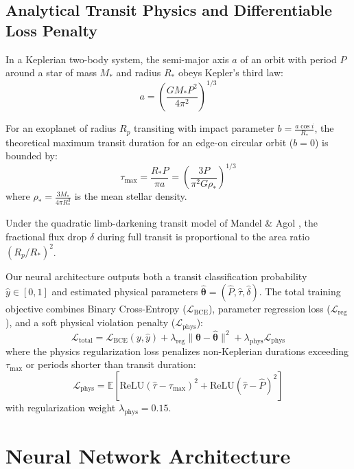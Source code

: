 \documentclass[11pt,a4paper]{article}
\begin{document}
\subsection{Analytical Transit Physics and Differentiable Loss Penalty}

In a Keplerian two-body system, the semi-major axis $a$ of an orbit with period $P$ around a star of mass $M_*$ and radius $R_*$ obeys Kepler's third law:
\begin{equation}
    a = \left( \frac{G M_* P^2}{4\pi^2} \right)^{1/3}
\end{equation}

For an exoplanet of radius $R_p$ transiting with impact parameter $b = \frac{a \cos i}{R_*}$, the theoretical maximum transit duration for an edge-on circular orbit ($b=0$) is bounded by:
\begin{equation}
    \tau_{\text{max}} = \frac{R_* P}{\pi a} = \left( \frac{3 P}{\pi^2 G \rho_*} \right)^{1/3}
\end{equation}
where $\rho_* = \frac{3 M_*}{4 \pi R_*^3}$ is the mean stellar density.

Under the quadratic limb-darkening transit model of Mandel \& Agol \citep{mandel2002analytic}, the fractional flux drop $\delta$ during full transit is proportional to the area ratio $(R_p / R_*)^2$.

Our neural architecture outputs both a transit classification probability $\hat{y} \in [0, 1]$ and estimated physical parameters $\hat{\boldsymbol{\theta}} = (\hat{P}, \hat{\tau}, \hat{\delta})$. The total training objective combines Binary Cross-Entropy ($\mathcal{L}_{\text{BCE}}$), parameter regression loss ($\mathcal{L}_{\text{reg}}$), and a soft physical violation penalty ($\mathcal{L}_{\text{phys}}$):
\begin{equation}
    \mathcal{L}_{\text{total}} = \mathcal{L}_{\text{BCE}}(y, \hat{y}) + \lambda_{\text{reg}} \|\boldsymbol{\theta} - \hat{\boldsymbol{\theta}}\|^2 + \lambda_{\text{phys}} \mathcal{L}_{\text{phys}}
\end{equation}
where the physics regularization loss penalizes non-Keplerian durations exceeding $\tau_{\text{max}}$ or periods shorter than transit duration:
\begin{equation}
    \mathcal{L}_{\text{phys}} = \mathbb{E}\left[ \text{ReLU}(\hat{\tau} - \tau_{\text{max}})^2 + \text{ReLU}(\hat{\tau} - \hat{P})^2 \right]
\end{equation}
with regularization weight $\lambda_{\text{phys}} = 0.15$.

\section{Neural Network Architecture}
\end{document}
